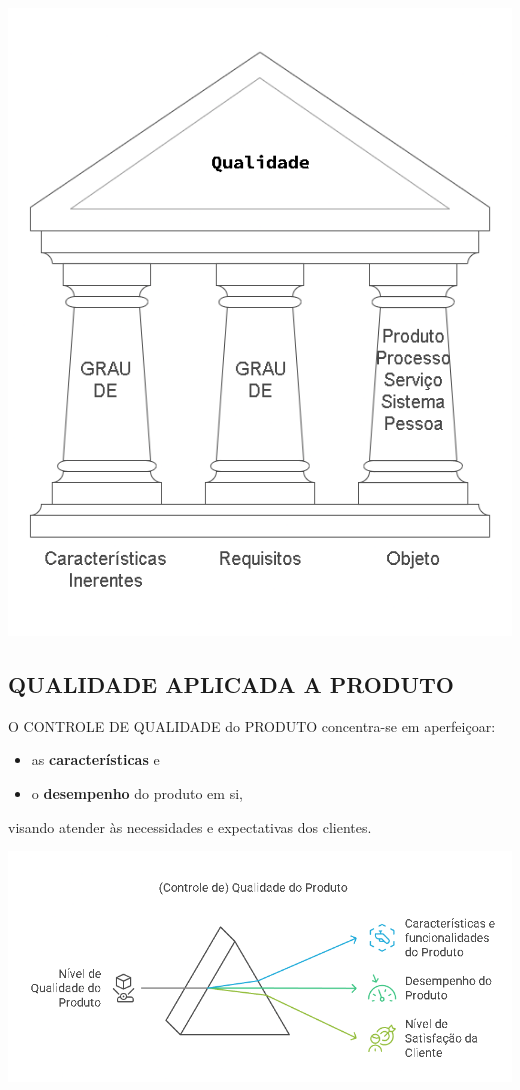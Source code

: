\documentclass[
]{book}
\begin{document}
\includegraphics{images/qualidade-geral/Qualidade.png}

\subsection{QUALIDADE APLICADA A PRODUTO}\label{qualidade-aplicada-a-produto}

O CONTROLE DE QUALIDADE do PRODUTO concentra-se em aperfeiçoar:

\begin{itemize}
\item
  as \textbf{características} e
\item
  o \textbf{desempenho} do produto em si,
\end{itemize}

visando atender às necessidades e expectativas dos clientes.

\includegraphics{images/qualidade-geral/Qualidade_do_Produto.png}
\end{document}
